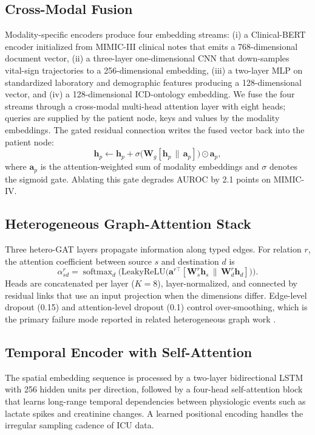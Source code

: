 \documentclass[conference]{IEEEtran}
\begin{document}
\subsection{Cross-Modal Fusion}
Modality-specific encoders produce four embedding streams: (i) a Clinical-BERT encoder initialized from MIMIC-III clinical notes that emits a 768-dimensional document vector, (ii) a three-layer one-dimensional CNN that down-samples vital-sign trajectories to a 256-dimensional embedding, (iii) a two-layer MLP on standardized laboratory and demographic features producing a 128-dimensional vector, and (iv) a 128-dimensional ICD-ontology embedding. We fuse the four streams through a cross-modal multi-head attention layer with eight heads; queries are supplied by the patient node, keys and values by the modality embeddings. The gated residual connection writes the fused vector back into the patient node:
\begin{equation}
\mathbf{h}_p\leftarrow\mathbf{h}_p+\sigma\big(\mathbf{W}_g[\mathbf{h}_p\,\|\,\mathbf{a}_p]\big)\odot\mathbf{a}_p,
\label{eq:fusion}
\end{equation}
where $\mathbf{a}_p$ is the attention-weighted sum of modality embeddings and $\sigma$ denotes the sigmoid gate. Ablating this gate degrades AUROC by 2.1 points on MIMIC-IV.

\subsection{Heterogeneous Graph-Attention Stack}
Three hetero-GAT layers propagate information along typed edges. For relation $r$, the attention coefficient between source $s$ and destination $d$ is
\begin{equation}
\alpha^{r}_{sd}=\operatorname{softmax}_{d}\Big(\mathrm{LeakyReLU}\big(\mathbf{a}^{r\top}[\mathbf{W}^{r}_{s}\mathbf{h}_s\,\|\,\mathbf{W}^{r}_{d}\mathbf{h}_d]\big)\Big).
\label{eq:gat}
\end{equation}
Heads are concatenated per layer ($K=8$), layer-normalized, and connected by residual links that use an input projection when the dimensions differ. Edge-level dropout (0.15) and attention-level dropout (0.1) control over-smoothing, which is the primary failure mode reported in related heterogeneous graph work \cite{hosseini2018heteromed}.

\subsection{Temporal Encoder with Self-Attention}
The spatial embedding sequence is processed by a two-layer bidirectional LSTM with 256 hidden units per direction, followed by a four-head self-attention block that learns long-range temporal dependencies between physiologic events such as lactate spikes and creatinine changes. A learned positional encoding handles the irregular sampling cadence of ICU data.
\end{document}

